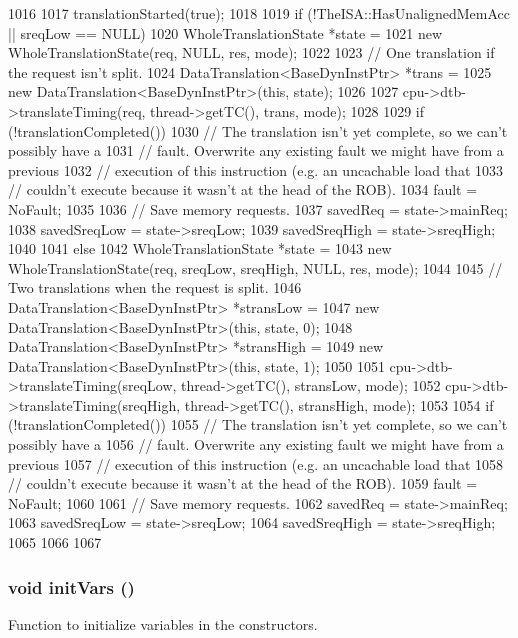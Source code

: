 \begin{DoxyCode}
1016 {
1017     translationStarted(true);
1018 
1019     if (!TheISA::HasUnalignedMemAcc || sreqLow == NULL) {
1020         WholeTranslationState *state =
1021             new WholeTranslationState(req, NULL, res, mode);
1022 
1023         // One translation if the request isn't split.
1024         DataTranslation<BaseDynInstPtr> *trans =
1025             new DataTranslation<BaseDynInstPtr>(this, state);
1026 
1027         cpu->dtb->translateTiming(req, thread->getTC(), trans, mode);
1028 
1029         if (!translationCompleted()) {
1030             // The translation isn't yet complete, so we can't possibly have a
1031             // fault. Overwrite any existing fault we might have from a previous
1032             // execution of this instruction (e.g. an uncachable load that
1033             // couldn't execute because it wasn't at the head of the ROB).
1034             fault = NoFault;
1035 
1036             // Save memory requests.
1037             savedReq = state->mainReq;
1038             savedSreqLow = state->sreqLow;
1039             savedSreqHigh = state->sreqHigh;
1040         }
1041     } else {
1042         WholeTranslationState *state =
1043             new WholeTranslationState(req, sreqLow, sreqHigh, NULL, res, mode);
1044 
1045         // Two translations when the request is split.
1046         DataTranslation<BaseDynInstPtr> *stransLow =
1047             new DataTranslation<BaseDynInstPtr>(this, state, 0);
1048         DataTranslation<BaseDynInstPtr> *stransHigh =
1049             new DataTranslation<BaseDynInstPtr>(this, state, 1);
1050 
1051         cpu->dtb->translateTiming(sreqLow, thread->getTC(), stransLow, mode);
1052         cpu->dtb->translateTiming(sreqHigh, thread->getTC(), stransHigh, mode);
1053 
1054         if (!translationCompleted()) {
1055             // The translation isn't yet complete, so we can't possibly have a
1056             // fault. Overwrite any existing fault we might have from a previous
1057             // execution of this instruction (e.g. an uncachable load that
1058             // couldn't execute because it wasn't at the head of the ROB).
1059             fault = NoFault;
1060 
1061             // Save memory requests.
1062             savedReq = state->mainReq;
1063             savedSreqLow = state->sreqLow;
1064             savedSreqHigh = state->sreqHigh;
1065         }
1066     }
1067 }
\end{DoxyCode}
\hypertarget{classBaseDynInst_a1b19937d8cca25bf52a51ae7de67ea94}{
\subsubsection[{initVars}]{\setlength{\rightskip}{0pt plus 5cm}void initVars ()}}
\label{classBaseDynInst_a1b19937d8cca25bf52a51ae7de67ea94}
Function to initialize variables in the constructors. 

